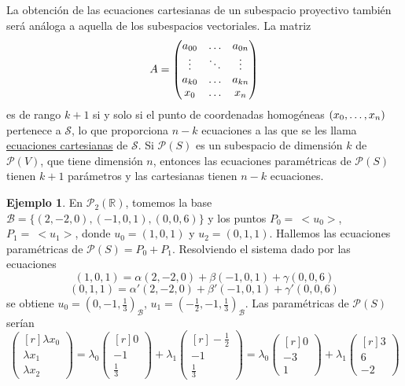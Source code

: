 \documentclass[12pt]{report}
\theoremstyle{definition}
\theoremstyle{definition}
\newtheorem{example}{Ejemplo}[chapter]
\theoremstyle{remark}
\newcommand{\R}{\mathbb R}
\begin{document}
\vspace{2mm}
La obtención de las ecuaciones cartesianas de un subespacio proyectivo también será análoga a aquella de los subespacios vectoriales. La matriz
\[A = \begin{pmatrix*}
    a_{00} & \mathellipsis & a_{0n} \\
    \vdots & \ddots & \vdots \\
    a_{k0} & \mathellipsis & a_{kn} \\
    x_0 & \mathellipsis & x_n
\end{pmatrix*}\]
es de rango $k+1$ si y solo si el punto de coordenadas homogéneas $(x_0,\mathellipsis,x_n)$ pertenece a $\mathcal{S}$, lo que proporciona $n-k$ ecuaciones a las que se les llama \ul{ecuaciones cartesianas} de $\mathcal{S}$. Si $\mathcal{P}(S)$ es un subespacio de dimensión $k$ de $\mathcal{P}(V)$, que tiene dimensión $n$, entonces las ecuaciones paramétricas de $\mathcal{P}(S)$ tienen $k+1$ parámetros y las cartesianas tienen $n-k$ ecuaciones.

\begin{example}
En $\mathcal{P}_2(\R)$, tomemos la base $\mathcal{B} = \{(2,-2,0),(-1,0,1),(0,0,6)\}$ y los puntos $P_0 = \ < u_0 >$, $P_1 = \ < u_1>$, donde $u_0 = (1,0,1)$ y $u_2 = (0,1,1)$. Hallemos las ecuaciones paramétricas de $\mathcal{P}(S) = P_0+P_1$. Resolviendo el sistema dado por las ecuaciones
\[(1,0,1) = \alpha(2,-2,0)+\beta(-1,0,1)+\gamma(0,0,6)\]
\[(0,1,1) = \alpha'(2,-2,0)+\beta'(-1,0,1)+\gamma'(0,0,6)\]
se obtiene $u_0 = (0,-1,\frac{1}{3})_{\mathcal{B}}$, $u_1 = (-\frac{1}{2},-1,\frac{1}{3})_{\mathcal{B}}$. Las paramétricas de $\mathcal{P}(S)$ serían
\[
\begin{pmatrix*}[r]
\lambda x_0 \\
\lambda x_1 \\
\lambda x_2
\end{pmatrix*} = \lambda_0 \begin{pmatrix*}[r]
0 \\
-1 \\
\frac{1}{3}
\end{pmatrix*}
+ \lambda_1 \begin{pmatrix*}[r]
-\frac{1}{2} \\
-1 \\
\frac{1}{3}
\end{pmatrix*} = \lambda_0 \begin{pmatrix*}[r]
0 \\
-3 \\
1
\end{pmatrix*}
+ \lambda_1 \begin{pmatrix*}[r]
3 \\
6 \\
-2
\end{pmatrix*}
\]
\end{example}
\end{document}
